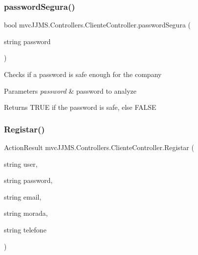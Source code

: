 \subsubsection{\texorpdfstring{password\+Segura()}{passwordSegura()}}
{\footnotesize\ttfamily bool mvc\+J\+J\+M\+S.\+Controllers.\+Cliente\+Controller.\+password\+Segura (\begin{DoxyParamCaption}\item[{string}]{password }\end{DoxyParamCaption})\hspace{0.3cm}{\ttfamily [inline]}}



Checks if a password is safe enough for the company 


\begin{DoxyParams}{Parameters}
{\em password} & password to analyze\\
\hline
\end{DoxyParams}
\begin{DoxyReturn}{Returns}
T\+R\+UE if the password is safe, else F\+A\+L\+SE
\end{DoxyReturn}
\mbox{\label{classmvc_j_j_m_s_1_1_controllers_1_1_cliente_controller_a31325ea0231ffa6f09996a9f61f1731b}} 
\subsubsection{\texorpdfstring{Registar()}{Registar()}}
{\footnotesize\ttfamily Action\+Result mvc\+J\+J\+M\+S.\+Controllers.\+Cliente\+Controller.\+Registar (\begin{DoxyParamCaption}\item[{string}]{user,  }\item[{string}]{password,  }\item[{string}]{email,  }\item[{string}]{morada,  }\item[{string}]{telefone }\end{DoxyParamCaption})\hspace{0.3cm}{\ttfamily [inline]}}



